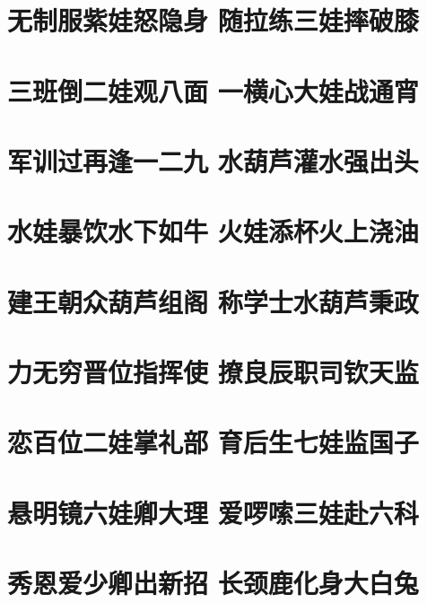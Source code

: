 \documentclass[12pt, a4paper]{book}
\begin{document}
\begin{CJK}{UTF8}{gbsn}
    \chapter{无制服紫娃怒隐身 随拉练三娃摔破膝}

    \chapter{三班倒二娃观八面 一横心大娃战通宵}

    \chapter{军训过再逢一二九 水葫芦灌水强出头}

    \chapter{水娃暴饮水下如牛 火娃添杯火上浇油}
    
    \chapter{建王朝众葫芦组阁 称学士水葫芦秉政}
    
    \chapter{力无穷晋位指挥使 撩良辰职司钦天监}
    
    \chapter{恋百位二娃掌礼部 育后生七娃监国子}
    
    \chapter{悬明镜六娃卿大理 爱啰嗦三娃赴六科}
    
    \chapter{秀恩爱少卿出新招 长颈鹿化身大白兔}

    \appendix

    

\end{CJK}
\end{document}
